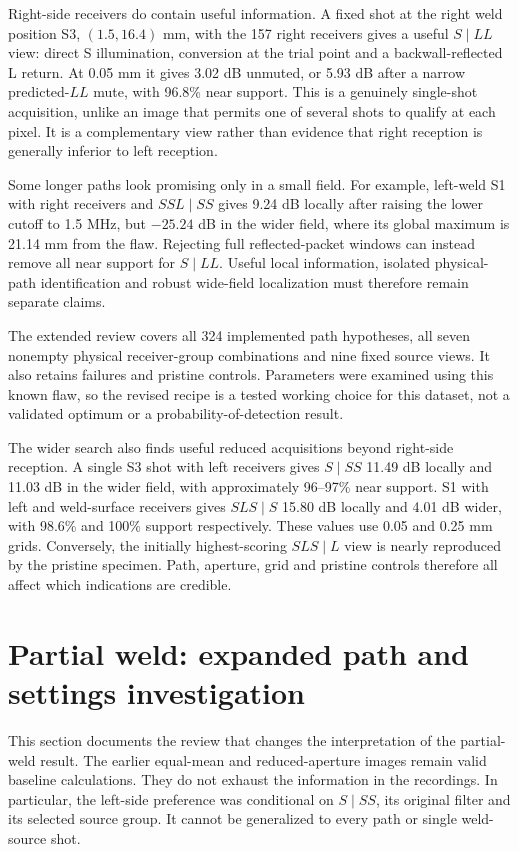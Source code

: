 \documentclass[11pt]{article}
\begin{document}
Right-side receivers do contain useful information. A fixed shot at the right weld position S3, $(1.5,16.4)$ mm, with the 157 right receivers gives a useful $S\mid LL$ view: direct S illumination, conversion at the trial point and a backwall-reflected L return. At 0.05 mm it gives 3.02 dB unmuted, or 5.93 dB after a narrow predicted-$LL$ mute, with 96.8\% near support. This is a genuinely single-shot acquisition, unlike an image that permits one of several shots to qualify at each pixel. It is a complementary view rather than evidence that right reception is generally inferior to left reception.

Some longer paths look promising only in a small field. For example, left-weld S1 with right receivers and $SSL\mid SS$ gives 9.24 dB locally after raising the lower cutoff to 1.5 MHz, but $-25.24$ dB in the wider field, where its global maximum is 21.14 mm from the flaw. Rejecting full reflected-packet windows can instead remove all near support for $S\mid LL$. Useful local information, isolated physical-path identification and robust wide-field localization must therefore remain separate claims.

The extended review covers all 324 implemented path hypotheses, all seven nonempty physical receiver-group combinations and nine fixed source views. It also retains failures and pristine controls. Parameters were examined using this known flaw, so the revised recipe is a tested working choice for this dataset, not a validated optimum or a probability-of-detection result.

The wider search also finds useful reduced acquisitions beyond right-side reception. A single S3 shot with left receivers gives $S\mid SS$ 11.49 dB locally and 11.03 dB in the wider field, with approximately 96--97\% near support. S1 with left and weld-surface receivers gives $SLS\mid S$ 15.80 dB locally and 4.01 dB wider, with 98.6\% and 100\% support respectively. These values use 0.05 and 0.25 mm grids. Conversely, the initially highest-scoring $SLS\mid L$ view is nearly reproduced by the pristine specimen. Path, aperture, grid and pristine controls therefore all affect which indications are credible.


\section{Partial weld: expanded path and settings investigation}
\label{saft:expanded_review}
This section documents the review that changes the interpretation of the partial-weld result. The earlier equal-mean and reduced-aperture images remain valid baseline calculations. They do not exhaust the information in the recordings. In particular, the left-side preference was conditional on $S\mid SS$, its original filter and its selected source group. It cannot be generalized to every path or single weld-source shot.
\end{document}
